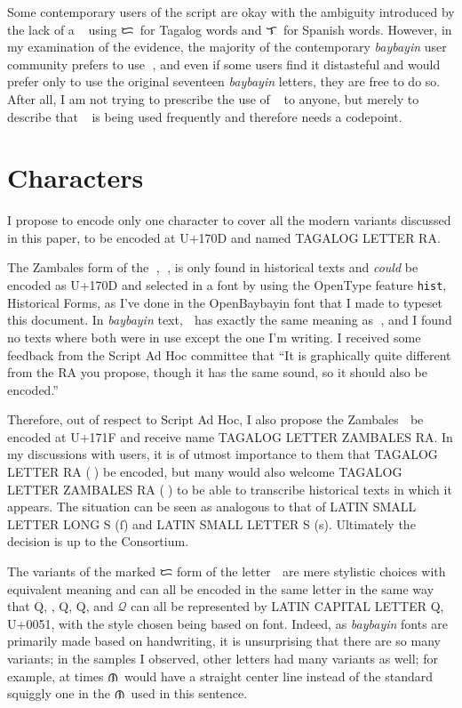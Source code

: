 \documentclass[a4paper,pagesize,openany,14pt,parskip=never]{scrbook}
\newcommand{\≈}{$\approx$}
\newcommand{\la}{{\baybayin ᜎ}}
\newcommand{\da}{{\baybayin ᜇ}}
\newcommand{\ra}{{\baybayin ᜍ}}
\newcommand{\na}{{\baybayin ᜈ}}
\newcommand{\cochinQ}{{\cochin Q}}
\begin{document}
Some contemporary users of the script are okay with the ambiguity introduced by the lack of a \ra\, using \da\ for Tagalog words and \la\ for Spanish words. However, in my examination of the evidence, the majority of the contemporary {\em baybayin} user community prefers to use \ra, and even if some users find it distasteful and would prefer only to use the original seventeen {\em baybayin} letters, they are free to do so. After all, I am not trying to prescribe the use of \ra\ to anyone, but merely to describe that \ra\ is being used frequently and therefore needs a codepoint.

\section{Characters}
I propose to encode only one character to cover all the modern variants discussed in this paper, to be encoded at U+170D and named \textsf{TAGALOG LETTER RA}. 

The Zambales form of the {\baybayin ᜍ}, {\baybayinh ᜍ}, is only found in historical texts and {\em could} be encoded as U+170D and selected in a font by using the OpenType feature \texttt{hist}, \textsf{Historical Forms}, as I've done in the OpenBaybayin font that I made to typeset this document. In {\em baybayin} text, {\baybayinh ᜍ} has exactly the same meaning as {\baybayin ᜍ}, and I found no texts where both were in use except the one I'm writing. I received some feedback from the Script Ad Hoc committee that ``It is graphically quite different from the RA you propose, though it has the same sound, so it should also be encoded.''

Therefore, out of respect to Script Ad Hoc, I also propose the Zambales {\baybayinh ᜍ} be encoded at U+171F and receive name \textsf{TAGALOG LETTER ZAMBALES RA}. In my discussions with users, it is of utmost importance to them that \textsf{TAGALOG LETTER RA} (\ra) be encoded, but many would also welcome \textsf{TAGALOG LETTER ZAMBALES RA} ({\baybayinh ᜍ}) to be able to transcribe historical texts in which it appears. The situation can be seen as analogous to that of \textsf{LATIN SMALL LETTER LONG S} (ſ) and \textsf{LATIN SMALL LETTER S} (s). Ultimately the decision is up to the Consortium.

The variants of the marked {\baybayin ᜇ} form of the letter {\baybayin ᜍ} are mere stylistic choices with equivalent meaning and can all be encoded in the same letter in the same way that Q, {}, \textsf{Q}, \cochinQ, and $\mathscr{Q}$ can all be represented by \textsf{LATIN CAPITAL LETTER Q}, U+0051, with the style chosen being based on font. Indeed, as {\em baybayin} fonts are primarily made based on handwriting, it is unsurprising that there are so many variants; in the samples I observed, other letters had many variants as well; for example, at times \na\ would have a straight center line instead of the standard squiggly one in the \na\ used in this sentence.
\end{document}
